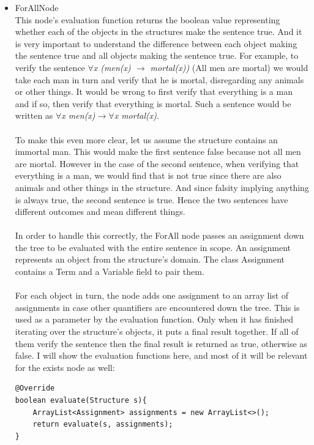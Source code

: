 \documentclass{report}
\begin{document}
\begin{itemize}
\item ForAllNode\\
This node's evaluation function returns the boolean value representing whether 
each of the objects in the structures make the sentence true. And it is very 
important to understand the difference between each object making the sentence 
true and all objects making the sentence true. For example, to verify the 
sentence \emph{$\forall$x (men(x) $\rightarrow$ mortal(x))} (All men are mortal) 
we would take each man in turn and verify that he is mortal, disregarding any 
animals or other things. It would be wrong to first verify that everything is a 
man and if so, then verify that everything is mortal. Such a sentence would be 
written as \emph{$\forall$x men(x)$ \rightarrow \forall$x mortal(x)}. 
\\ \\
To make this even more clear, let us assume the structure contains an immortal 
man. This would make the first sentence false because not all men are mortal. 
However in the case of the second sentence, when verifying that everything is a 
man, we would find that is not true since there are also animals and other 
things in the structure. And since falsity implying anything is always true, the 
second sentence is true. Hence the two sentences have different outcomes and 
mean different things. 
\\ \\
In order to handle this correctly, the ForAll node passes an assignment down 
the tree to be evaluated with the entire sentence in scope. An assignment 
represents an object from the structure's domain. The class Assignment contains 
a Term and a Variable field to pair them. 
\\ \\
For each object in turn, the node adds one assignment to an array list
of assignments in case other quantifiers are encountered down the tree. 
This is used as a parameter by the evaluation function. Only when it has 
finished iterating over the structure's objects, it puts a final result 
together. If all of them verify the sentence then the final result is 
returned as true, otherwise as false. I will show the evaluation
functions here, and most of it will be relevant for the exists node as well:
\begin{verbatim}
@Override
boolean evaluate(Structure s){
    ArrayList<Assignment> assignments = new ArrayList<>();
    return evaluate(s, assignments);
}


\end{verbatim}
\end{itemize}
\end{document}
